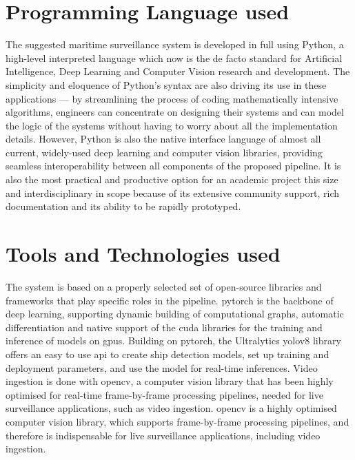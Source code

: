 \section{Programming Language used}
The suggested maritime surveillance system is developed in full using Python, a high-level interpreted language which now is the de facto standard for Artificial Intelligence, Deep Learning and Computer Vision research and development. The simplicity and eloquence of Python's syntax are also driving its use in these applications — by streamlining the process of coding mathematically intensive algorithms, engineers can concentrate on designing their systems and can model the logic of the systems without having to worry about all the implementation details. However, Python is also the native interface language of almost all current, widely-used deep learning and computer vision libraries, providing seamless interoperability between all components of the proposed pipeline. It is also the most practical and productive option for an academic project this size and interdisciplinary in scope because of its extensive community support, rich documentation and its ability to be rapidly prototyped.

\section{Tools and Technologies used}
The system is based on a properly selected set of open-source libraries and frameworks that play specific roles in the pipeline. \gls{pytorch} is the backbone of deep learning, supporting dynamic building of computational graphs, automatic differentiation and native support of the \gls{cuda} libraries for the training and inference of models on \glspl{gpu}. Building on \gls{pytorch}, the Ultralytics \gls{yolov8} library offers an easy to use \gls{api} to create ship detection models, set up training and deployment parameters, and use the model for real-time inferences. Video ingestion is done with \gls{opencv}, a computer vision library that has been highly optimised for real-time frame-by-frame processing pipelines, needed for live surveillance applications, such as video ingestion. \gls{opencv} is a highly optimised computer vision library, which supports frame-by-frame processing pipelines, and therefore is indispensable for live surveillance applications, including video ingestion. 

\setlength{\parskip}{1em}

